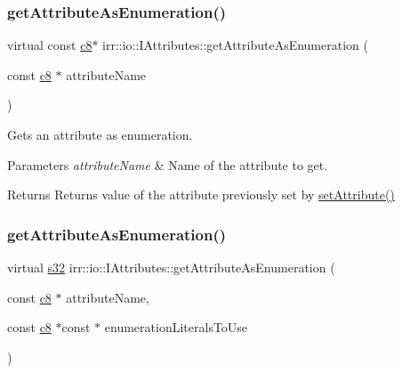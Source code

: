 \subsubsection{\texorpdfstring{get\+Attribute\+As\+Enumeration()}{getAttributeAsEnumeration()}\hspace{0.1cm}{\footnotesize\ttfamily [2/8]}}
{\footnotesize\ttfamily virtual const \hyperlink{namespaceirr_a9395eaea339bcb546b319e9c96bf7410}{c8}$\ast$ irr\+::io\+::\+I\+Attributes\+::get\+Attribute\+As\+Enumeration (\begin{DoxyParamCaption}\item[{const \hyperlink{namespaceirr_a9395eaea339bcb546b319e9c96bf7410}{c8} $\ast$}]{attribute\+Name }\end{DoxyParamCaption})\hspace{0.3cm}{\ttfamily [pure virtual]}}



Gets an attribute as enumeration. 


\begin{DoxyParams}{Parameters}
{\em attribute\+Name} & Name of the attribute to get. \\
\hline
\end{DoxyParams}
\begin{DoxyReturn}{Returns}
Returns value of the attribute previously set by \hyperlink{classirr_1_1io_1_1IAttributes_a03fa31acb481ae23678676cc183f09a6}{set\+Attribute()} 
\end{DoxyReturn}
\mbox{\label{classirr_1_1io_1_1IAttributes_a77c6a5fba661a85701986382df7d13b3}} 
\subsubsection{\texorpdfstring{get\+Attribute\+As\+Enumeration()}{getAttributeAsEnumeration()}\hspace{0.1cm}{\footnotesize\ttfamily [3/8]}}
{\footnotesize\ttfamily virtual \hyperlink{namespaceirr_ac66849b7a6ed16e30ebede579f9b47c6}{s32} irr\+::io\+::\+I\+Attributes\+::get\+Attribute\+As\+Enumeration (\begin{DoxyParamCaption}\item[{const \hyperlink{namespaceirr_a9395eaea339bcb546b319e9c96bf7410}{c8} $\ast$}]{attribute\+Name,  }\item[{const \hyperlink{namespaceirr_a9395eaea339bcb546b319e9c96bf7410}{c8} $\ast$const $\ast$}]{enumeration\+Literals\+To\+Use }\end{DoxyParamCaption})\hspace{0.3cm}{\ttfamily [pure virtual]}}



